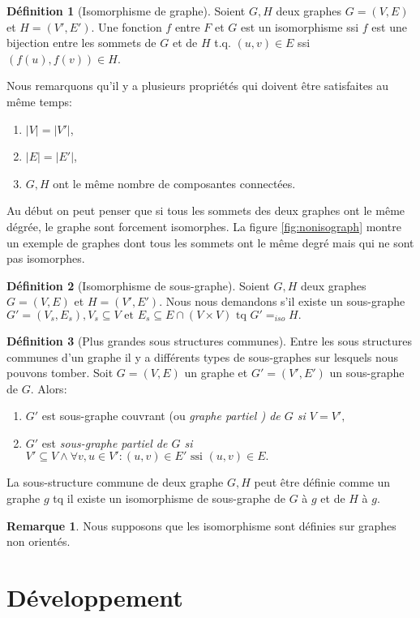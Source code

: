 \documentclass[french]{article}
\theoremstyle{definition}
\newtheorem{deff}{D\'efinition}[section]
\newtheorem{rem}{Remarque}[section]
\theoremstyle{remark}
\begin{document}
\begin{deff}[Isomorphisme de graphe]
Soient $G, H$ deux graphes $G=(V, E)$ et $H=(V', E')$. Une fonction $f$ entre $ F $ et $ G $ est un isomorphisme ssi $ f $ est une bijection entre les sommets de $ G $ et de $ H $ t.q. $ (u,v) \in E$ ssi $ (f(u), f(v)) \in H$.
\end{deff}
Nous remarquons qu'il y a plusieurs propriétés qui doivent être satisfaites au même temps:
 \begin{enumerate}[label=(\roman*)]
 	\item $|V|=|V'|$,
 	\item $|E|=|E'|$,
 	\item $G, H$ ont le même nombre de composantes connectées.
 \end{enumerate}
Au début on peut penser que si tous les sommets des deux graphes ont le même dégrée, le graphe sont forcement isomorphes. 
La figure \ref{fig:nonisograph} montre un exemple de graphes dont tous les sommets ont le même degré mais qui ne sont pas isomorphes.
\begin{deff}[Isomorphisme de sous-graphe]
Soient $G, H$ deux graphes $G=(V, E)$ et $H=(V', E')$. Nous nous demandons s'il existe un sous-graphe $ G'=(V_s, E_s), V_s \subseteq V \text{ et } E_s \subseteq E \cap (V \times V) \text{ tq } G' =_{iso} H. $
\end{deff}
\begin{deff}[Plus grandes sous structures communes]
Entre les sous structures communes d'un graphe il y a différents types de sous-graphes sur lesquels nous pouvons tomber. Soit $G=(V,E)$ un graphe et $G'=(V',E')$ un sous-graphe de $G$. Alors:
\begin{enumerate}
	\item $G'$ est sous-graphe couvrant (ou \it graphe partiel \rm) de $G$ si $V=V',$
	\item $G'$ est \it sous-graphe partiel \rm de $G$ si $V' \subseteq V \land \forall v,u \in V' : (u,v) \in E'  \text{ ssi } (u,v) \in E.$ 
\end{enumerate}
La sous-structure commune de deux graphe $G, H$ peut être définie comme un graphe $g$ tq il existe un isomorphisme de sous-graphe de $G$ à $g$ et de $H$ à $g$.
\end{deff}
\begin{rem}
	Nous supposons que les isomorphisme sont définies sur graphes non orientés.
\end{rem}

\newpage
\section{Développement}
\label{sec:Développement}
\end{document}

